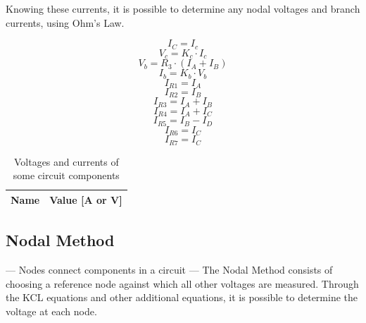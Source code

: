 Knowing these currents, it is possible to determine any nodal voltages and branch currents, using Ohm’s Law.

\begin{equation}
  I_C=I_c
\end{equation}
\begin{equation}
  V_c=K_c\cdot I_c
\end{equation}
\begin{equation}
  V_b=R_3\cdot (I_A+I_B)
\end{equation}
\begin{equation}
  I_b=K_b\cdot V_b
\end{equation}
\begin{equation}
  I_{R1}=I_A
\end{equation}
\begin{equation}
  I_{R2}=I_B
\end{equation}
\begin{equation}
  I_{R3}=I_A+I_B 
\end{equation}
\begin{equation}
  I_{R4}=I_A+I_C
\end{equation}
\begin{equation}
  I_{R5}=I_B - I_D
\end{equation}
\begin{equation}
  I_{R6}=I_C
\end{equation}
\begin{equation}
  I_{R7}=I_C
\end{equation}

\begin{table}[H]
  \centering
  \begin{tabular}{|l|r|}
    \hline    
    {\bf Name} & {\bf Value [A or V]} \\ \hline
    
  \end{tabular}
  \caption{Voltages and currents of some circuit components}
  \label{tab:valm}
\end{table}
 
\subsection{Nodal Method}

--- Nodes connect components in a circuit ---
The Nodal Method consists of choosing a reference node against which all other voltages are measured. Through the KCL equations and other additional equations, it is possible to determine the voltage at each node.

